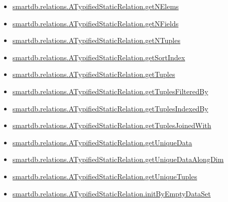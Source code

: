 \documentclass[letterpaper,10pt,english]{sphinxmanual}
\begin{document}
\begin{itemize}
\item {} 
{\hyperref[chap_func:smartdb-relations-atypifiedstaticrelation-getnelems]{smartdb.relations.ATypifiedStaticRelation.getNElems}}

\item {} 
{\hyperref[chap_func:smartdb-relations-atypifiedstaticrelation-getnfields]{smartdb.relations.ATypifiedStaticRelation.getNFields}}

\item {} 
{\hyperref[chap_func:smartdb-relations-atypifiedstaticrelation-getntuples]{smartdb.relations.ATypifiedStaticRelation.getNTuples}}

\item {} 
{\hyperref[chap_func:smartdb-relations-atypifiedstaticrelation-getsortindex]{smartdb.relations.ATypifiedStaticRelation.getSortIndex}}

\item {} 
{\hyperref[chap_func:smartdb-relations-atypifiedstaticrelation-gettuples]{smartdb.relations.ATypifiedStaticRelation.getTuples}}

\item {} 
{\hyperref[chap_func:smartdb-relations-atypifiedstaticrelation-gettuplesfilteredby]{smartdb.relations.ATypifiedStaticRelation.getTuplesFilteredBy}}

\item {} 
{\hyperref[chap_func:smartdb-relations-atypifiedstaticrelation-gettuplesindexedby]{smartdb.relations.ATypifiedStaticRelation.getTuplesIndexedBy}}

\item {} 
{\hyperref[chap_func:smartdb-relations-atypifiedstaticrelation-gettuplesjoinedwith]{smartdb.relations.ATypifiedStaticRelation.getTuplesJoinedWith}}

\item {} 
{\hyperref[chap_func:smartdb-relations-atypifiedstaticrelation-getuniquedata]{smartdb.relations.ATypifiedStaticRelation.getUniqueData}}

\item {} 
{\hyperref[chap_func:smartdb-relations-atypifiedstaticrelation-getuniquedataalongdim]{smartdb.relations.ATypifiedStaticRelation.getUniqueDataAlongDim}}

\item {} 
{\hyperref[chap_func:smartdb-relations-atypifiedstaticrelation-getuniquetuples]{smartdb.relations.ATypifiedStaticRelation.getUniqueTuples}}

\item {} 
{\hyperref[chap_func:smartdb-relations-atypifiedstaticrelation-initbyemptydataset]{smartdb.relations.ATypifiedStaticRelation.initByEmptyDataSet}}


\end{itemize}
\end{document}
